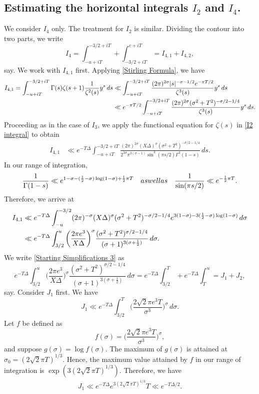 \documentclass[11pt]{amsart}
\numberwithin{equation}{section}
\numberwithin{figure}{section}
\theoremstyle{definition}
\begin{document}
\subsection*{Estimating the horizontal integrals $I_2$ and $I_4$.} We consider $I_4$ only. The treatment for $I_2$ is similar. Dividing the contour into two parts, we write
\[ I_4 =  \int_{-u+iT}^{-3/2+iT}+ \int_{-3/2+iT}^{c+iT} = I_{4,1}+I_{4,2},
\]
say. We work with $I_{4,1}$ first. Applying \eqref{Stirling Formula}, we have
\begin{align}\label{I2 integral}
I_{4,1} = \int_{-u+iT}^{-3/2+iT} \Gamma(s) \zeta(s+1) \frac{1}{\zeta^2(s)} y^s \,ds &\ll \int_{-u+iT}^{-3/2+iT} \frac{(2 \pi)^{2\sigma}\lvert s \rvert^{-\sigma-1/2} e^{-\pi T/2}}{\zeta^3(s)}y^s \,ds \notag \\
&\ll e^{-\pi T/2} \int_{-u+iT}^{-3/2+iT} \frac{(2\pi)^{2\sigma}(\sigma^2+T^2 )^{-\sigma/2-1/4}}{ \zeta^3(s)}y^s \,ds.
\end{align}
Proceeding as in the case of $I_3$, we apply the functional equation for $\zeta(s)$ in \eqref{I2 integral} to obtain
\begin{align*}
I_{4,1} &\ll e^{-T\Delta} \int_{-u+iT}^{-3/2+iT} \frac{(2\pi)^{2\sigma} (X\Delta)^\sigma (\sigma^2+T^2 )^{-\sigma/2-1/4}}{2^{3\sigma} \pi^{3(\sigma-1)}\sin^3(\pi s/2)\Gamma^3(1-s)} \,ds.
\end{align*}
In our range of integration,
\begin{align*}
    \frac{1}{\Gamma(1-s)} \ll e^{1-\sigma - (\frac{1}{2}-\sigma)\log (1-\sigma) + \frac{1}{2}\pi T} \quad \textnormal{as well as} \quad \frac{1}{\sin(\pi s/2)} \ll e^{- \frac{1}{2}\pi T} .
\end{align*}
Therefore, we arrive at
\begin{align}
I_{4,1} &\ll e^{-T\Delta} \int_{-u}^{-3/2} (2\pi)^{-\sigma}(X\Delta)^\sigma (\sigma^2+T^2 )^{-\sigma/2-1/4}e^{3(1-\sigma) - 3(\frac{1}{2}-\sigma)\log (1-\sigma)} \,d\sigma \notag \\
&\ll e^{-T\Delta} \int_{3/2}^{u}  \bigg (\frac{2\pi e^3}{X\Delta} \bigg)^{\sigma} \frac{(\sigma^2+T^2 )^{\sigma/2-1/4}}{ (\sigma+1)^{3(\sigma+\frac{1}{2})}} \,d\sigma. \label{Starting Simplifications 3}
\end{align}
We write \eqref{Starting Simplifications 3} as
\[
 e^{-T\Delta}\int_{3/2}^{u}  \bigg (\frac{2\pi e^3}{X\Delta} \bigg)^{\sigma} \frac{(\sigma^2+T^2 )^{\sigma/2-1/4}}{ (\sigma+1)^{3(\sigma+\frac{1}{2})}} \,d\sigma = e^{-T\Delta}\int_{3/2}^{T}+ e^{-T\Delta}\int_{T}^{u} = J_1 +J_2,
\]
say. Consider $J_1$ first. We have
\[J_1 \ll  e^{-T\Delta}\int_{3/2}^{T}  \bigg (\frac{2\sqrt{2}\pi e^3 T}{\sigma^3} \bigg)^{\sigma}  \,d\sigma.
\]
Let $f$ be defined as
\[
f(\sigma) = \bigg (\frac{2\sqrt{2}\pi e^3 T}{\sigma^3} \bigg)^{\sigma},
\]
and suppose $g(\sigma) = \log f(\sigma)$. The maximum of $g(\sigma)$ is attained at $\sigma_{0} = (2\sqrt{2}\pi T )^{1/3}$. Hence, the maximum value attained by $f$ in our range of integration is $\exp(3(2\sqrt{2}\pi T )^{1/3})$. Therefore, we have
\begin{align}\label{J1 Estimate}
J_1 \ll e^{-T\Delta} e^{3(2\sqrt{2}\pi T )^{1/3}} T \ll e^{-T\Delta/2}.
\end{align}
\end{document}
